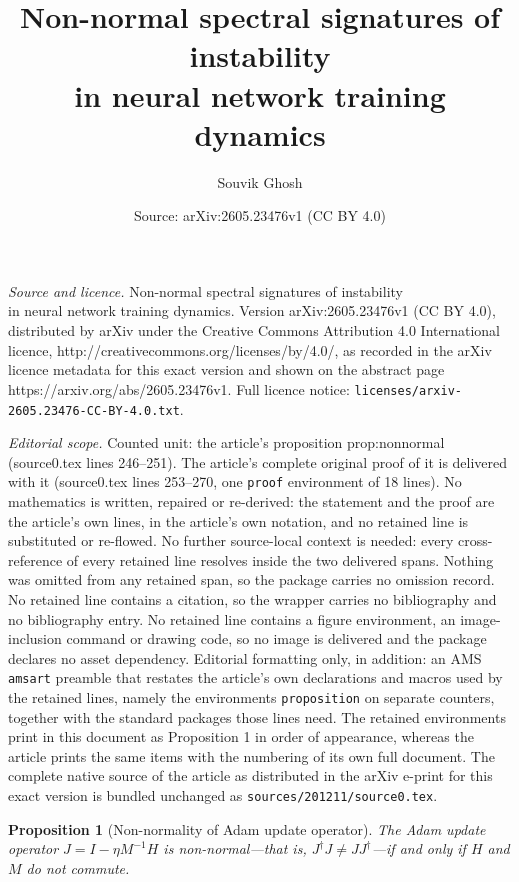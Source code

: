 \documentclass[10pt,a4paper]{amsart}
\title{Non-normal spectral signatures of instability\\ in neural network training dynamics}
\author{Souvik Ghosh}
\date{Source: arXiv:2605.23476v1 (CC BY 4.0)}
\newtheorem{proposition}{Proposition}
\begin{document}
\maketitle

\noindent\emph{Source and licence.} Non-normal spectral signatures of instability\\ in neural network training dynamics. Version arXiv:2605.23476v1 (CC BY 4.0), distributed by arXiv under the Creative Commons Attribution 4.0 International licence, http://creativecommons.org/licenses/by/4.0/, as recorded in the arXiv licence metadata for this exact version and shown on the abstract page https://arxiv.org/abs/2605.23476v1. Full licence notice: \texttt{licenses/arxiv-2605.23476-CC-BY-4.0.txt}.\par\smallskip

\noindent\textit{Editorial scope.} Counted unit: the article's proposition prop:nonnormal (source0.tex lines 246--251). The article's complete original proof of it is delivered with it (source0.tex lines 253--270, one \texttt{proof} environment of 18 lines). No mathematics is written, repaired or re-derived: the statement and the proof are the article's own lines, in the article's own notation, and no retained line is substituted or re-flowed.  No further source-local context is needed: every cross-reference of every retained line resolves inside the two delivered spans.  Nothing was omitted from any retained span, so the package carries no omission record.  No retained line contains a citation, so the wrapper carries no bibliography and no bibliography entry.  No retained line contains a figure environment, an image-inclusion command or drawing code, so no image is delivered and the package declares no asset dependency.  Editorial formatting only, in addition: an AMS \texttt{amsart} preamble that restates the article's own declarations and macros used by the retained lines, namely the environments \texttt{proposition} on separate counters, together with the standard packages those lines need.  The retained environments print in this document as Proposition 1 in order of appearance, whereas the article prints the same items with the numbering of its own full document.  The complete native source of the article as distributed in the arXiv e-print for this exact version is bundled unchanged as \texttt{sources/201211/source0.tex}.
\begin{proposition}[Non-normality of Adam update operator]
\label{prop:nonnormal}
The Adam update operator $J = I - \eta M^{-1}H$ is non-normal---that
is, $J^\dagger J \neq JJ^\dagger$---if and only if $H$ and $M$ do not
commute.
\end{proposition}
\end{document}
